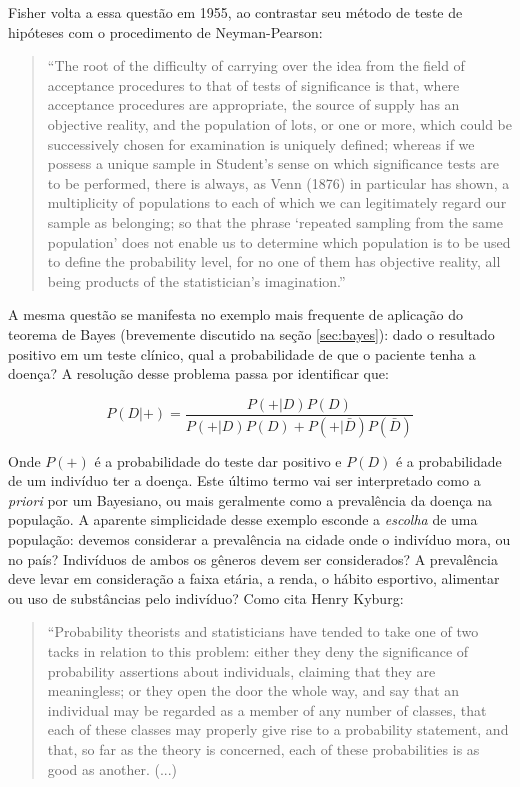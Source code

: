 Fisher volta a essa questão em 1955, ao contrastar seu método de teste de hipóteses com o procedimento de Neyman-Pearson:

\begin{quote}
``The root of the difficulty of carrying over the idea from the field of acceptance procedures to that of tests of significance
is that, where acceptance procedures are appropriate, the source of supply has an objective reality, and the population
of lots, or one or more, which could be successively chosen for examination is uniquely defined; whereas if we possess a unique
sample in Student's sense on which significance tests are to be performed, there is always, as Venn (1876) in particular has
shown, a multiplicity of populations to each of which we can legitimately regard our sample as belonging; so that the phrase
`repeated sampling from the same population' does not enable us to determine which population is to be used to define the
probability level, for no one of them has objective reality, all being products of the statistician's imagination.''
\citep{Fisher1955}
\end{quote}

A mesma questão se manifesta no exemplo mais frequente de aplicação do teorema de Bayes (brevemente discutido
na seção \ref{sec:bayes}): dado o resultado positivo em um
teste clínico, qual a probabilidade de que o paciente tenha a doença? A resolução desse problema passa por identificar que:

\begin{equation}
P(D|+) = \frac{P(+|D)P(D)}{P(+|D)P(D)+P(+|\bar D) P(\bar D)}
\end{equation}

Onde $P(+)$ é a probabilidade do teste dar positivo 
e $P(D)$ é a probabilidade de um
indivíduo ter a doença. Este último termo vai ser interpretado como a {\em priori} por um Bayesiano, ou mais geralmente
como a prevalência da doença na população. A aparente simplicidade desse exemplo esconde a {\em escolha} de uma população:
devemos considerar a prevalência na cidade onde o indivíduo mora, ou no país? Indivíduos de ambos os gêneros devem ser
considerados? A prevalência deve levar em consideração a faixa etária, a renda, o hábito esportivo, alimentar ou uso de
substâncias pelo indivíduo? Como cita Henry Kyburg:

\begin{quote}
``Probability theorists and statisticians have tended to take one of two tacks in relation to this problem:
either they deny the significance of probability assertions about individuals, claiming that they are meaningless;
or they open the door the whole way, and say that an individual may be regarded as a member of any number of classes, 
that each of these classes may properly give rise to a probability statement, and that, so far as the theory is concerned,
each of these probabilities is as good as another. (...)
\end{quote}

